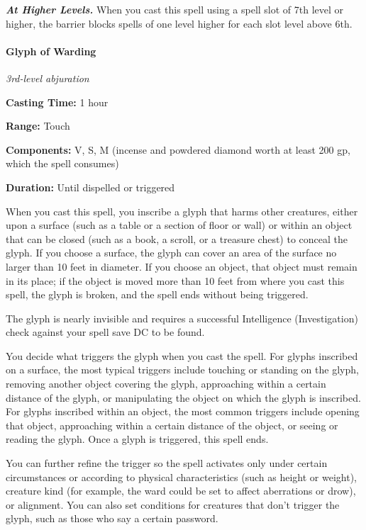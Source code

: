 \documentclass[
]{article}
\begin{document}
\emph{\textbf{At Higher Levels.}} When you cast this spell using a spell
slot of 7th level or higher, the barrier blocks spells of one level
higher for each slot level above 6th.

\hypertarget{glyph-of-warding}{%
\paragraph{Glyph of Warding}\label{glyph-of-warding}}

\emph{3rd-level abjuration}

\textbf{Casting Time:} 1 hour

\textbf{Range:} Touch

\textbf{Components:} V, S, M (incense and powdered diamond worth at
least 200 gp, which the spell consumes)

\textbf{Duration:} Until dispelled or triggered

When you cast this spell, you inscribe a glyph that harms other
creatures, either upon a surface (such as a table or a section of floor
or wall) or within an object that can be closed (such as a book, a
scroll, or a treasure chest) to conceal the glyph. If you choose a
surface, the glyph can cover an area of the surface no larger than 10
feet in diameter. If you choose an object, that object must remain in
its place; if the object is moved more than 10 feet from where you cast
this spell, the glyph is broken, and the spell ends without being
triggered.

The glyph is nearly invisible and requires a successful Intelligence
(Investigation) check against your spell save DC to be found.

You decide what triggers the glyph when you cast the spell. For glyphs
inscribed on a surface, the most typical triggers include touching or
standing on the glyph, removing another object covering the glyph,
approaching within a certain distance of the glyph, or manipulating the
object on which the glyph is inscribed. For glyphs inscribed within an
object, the most common triggers include opening that object,
approaching within a certain distance of the object, or seeing or
reading the glyph. Once a glyph is triggered, this spell ends.

You can further refine the trigger so the spell activates only under
certain circumstances or according to physical characteristics (such as
height or weight), creature kind (for example, the ward could be set to
affect aberrations or drow), or alignment. You can also set conditions
for creatures that don't trigger the glyph, such as those who say a
certain password.
\end{document}
